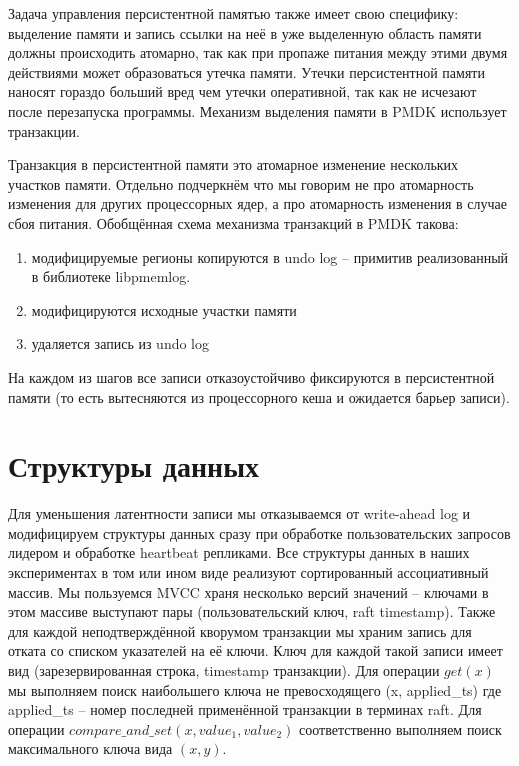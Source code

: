 \documentclass[pdftex,ptm,12pt,a4paper]{report}
\theoremstyle{definition}
\begin{document}
\label{allocations}
Задача управления персистентной памятью также имеет свою специфику: выделение памяти и запись ссылки на неё в уже выделенную область памяти должны происходить атомарно, так как
при пропаже питания между этими двумя действиями может образоваться утечка памяти. Утечки персистентной памяти наносят гораздо больший вред чем утечки оперативной,
так как не исчезают после перезапуска программы. Механизм выделения памяти в PMDK использует транзакции.

Транзакция в персистентной памяти это атомарное изменение нескольких участков памяти. Отдельно подчеркнём что мы говорим не про атомарность изменения для других процессорных ядер, а
про атомарность изменения в случае сбоя питания.
Обобщённая схема механизма транзакций в PMDK такова:
\begin{enumerate}
    \item модифицируемые регионы копируются в undo log -- примитив реализованный в библиотеке libpmemlog.
    \item модифицируются исходные участки памяти
    \item удаляется запись из undo log
\end{enumerate}
На каждом из шагов все записи отказоустойчиво фиксируются в персистентной памяти (то есть вытесняются из процессорного кеша и ожидается барьер записи).

\section{Структуры данных}
\label{datastructures}
Для уменьшения латентности записи мы отказываемся от write-ahead log и модифицируем структуры данных сразу при обработке пользовательских запросов лидером
и обработке heartbeat репликами. Все структуры данных в наших экспериментах в том или ином виде реализуют сортированный ассоциативный массив.
Мы пользуемся MVCC \cite{bernstein1983multiversion} храня несколько версий значений -- ключами в этом массиве выступают пары (пользовательский ключ, raft timestamp).
Также для каждой неподтверждённой кворумом транзакции мы храним запись для отката со списком указателей на её ключи. Ключ для каждой такой записи имеет вид
(зарезервированная строка, timestamp транзакции).
Для операции $get(x)$ мы выполняем поиск наибольшего ключа не превосходящего (x, applied\_ts) где applied\_ts -- номер последней применённой транзакции в терминах raft.
Для операции $compare\_and\_set(x, value_1, value_2)$ соответственно выполняем поиск максимального ключа вида $(x, y).$
\end{document}
